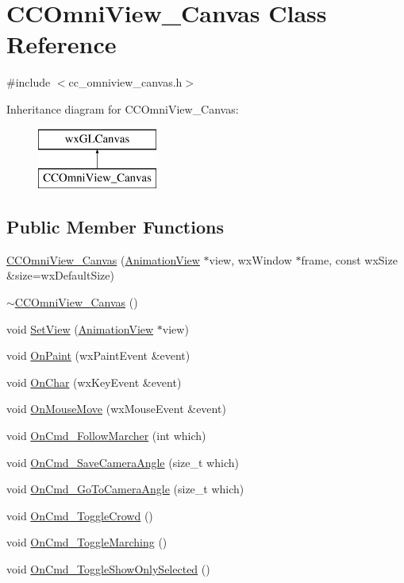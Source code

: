 \hypertarget{a00049}{\section{C\-C\-Omni\-View\-\_\-\-Canvas Class Reference}
\label{a00049}
}


{\ttfamily \#include $<$cc\-\_\-omniview\-\_\-canvas.\-h$>$}

Inheritance diagram for C\-C\-Omni\-View\-\_\-\-Canvas\-:\begin{figure}[H]
\begin{center}
\leavevmode
\includegraphics[height=2.000000cm]{a00049}
\end{center}
\end{figure}
\subsection*{Public Member Functions}
\begin{DoxyCompactItemize}
\item 
\hyperlink{a00049_a3fc09e3327a5620f2c3f7cb0fea28fab}{C\-C\-Omni\-View\-\_\-\-Canvas} (\hyperlink{a00015}{Animation\-View} $\ast$view, wx\-Window $\ast$frame, const wx\-Size \&size=wx\-Default\-Size)
\item 
\hyperlink{a00049_ae83d2497ad68db07582f904c8a80b8a6}{$\sim$\-C\-C\-Omni\-View\-\_\-\-Canvas} ()
\item 
void \hyperlink{a00049_a33a63201783809da9b89e35ce5573c15}{Set\-View} (\hyperlink{a00015}{Animation\-View} $\ast$view)
\item 
void \hyperlink{a00049_a8c35aa332886b0419dd6fd5dbe4c0835}{On\-Paint} (wx\-Paint\-Event \&event)
\item 
void \hyperlink{a00049_a208cb2d25466b7eaf97a546dba341653}{On\-Char} (wx\-Key\-Event \&event)
\item 
void \hyperlink{a00049_a18edf77ed13bce85a75ae9e401092671}{On\-Mouse\-Move} (wx\-Mouse\-Event \&event)
\item 
void \hyperlink{a00049_a5cbd3f39c70d8416e980ab05a46ce7f9}{On\-Cmd\-\_\-\-Follow\-Marcher} (int which)
\item 
void \hyperlink{a00049_a50aebf741afdc7732161ae12ac2a0eef}{On\-Cmd\-\_\-\-Save\-Camera\-Angle} (size\-\_\-t which)
\item 
void \hyperlink{a00049_aa84be7c65456cc042d78e666bec8cdb5}{On\-Cmd\-\_\-\-Go\-To\-Camera\-Angle} (size\-\_\-t which)
\item 
void \hyperlink{a00049_ac59d3c52c9759c500211373b9b540cb0}{On\-Cmd\-\_\-\-Toggle\-Crowd} ()
\item 
void \hyperlink{a00049_a94ca952ed179c60bd1789ee4029e9ec7}{On\-Cmd\-\_\-\-Toggle\-Marching} ()
\item 
void \hyperlink{a00049_ae520706e4e229f51be6d361cb8093830}{On\-Cmd\-\_\-\-Toggle\-Show\-Only\-Selected} ()
\end{DoxyCompactItemize}
